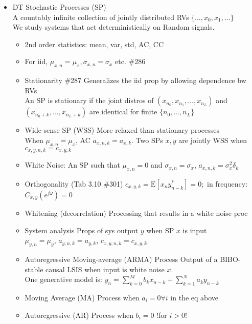 \documentclass{article}
\newcommand{\cg}{\color{gray}}
\newcommand{\fs}{\footnotesize}
\begin{document}
\begin{itemize}
	\item DT Stochastic Processes (SP)\\
	{\cg A countably infinite collection of jointly distributed RVs $\{\hdots, x_0, x_1, \hdots \}$\\
	We study systems that act deterministically on Random signals.}
	\begin{itemize}
		\item 2nd order statistics: {\cg mean, var, std, AC, CC}
		\item For iid, $\mu_{x,n}=\mu_x,\sigma_{x,n}=\sigma_x$ etc. \#286
		\item Stationarity \#287 {\cg Generalizes the iid prop by allowing dependence bw RVs}\\
		{\cg\fs An SP is stationary if the joint distros of $(x_{n_0},x_{n_1},\hdots,x_{n_L})$ and $(x_{n_0+k},\hdots,x_{n_L+k})$ are identical for finite $\{n_0,\hdots,n_L\}$}
		\item Wide-sense SP (WSS) {\cg More relaxed than stationary processes}\\
		{\cg\fs When $\mu_{x,n}=\mu_x$, AC $a_{x,n,k}=a_{x,k}$. Two SPs $x,y$ are jointly WSS when $c_{x,y,n,k}=c_{x,y,k}$}
		\item White Noise: {\cg An SP such that $\mu_{x,n}=0$ and $\sigma_{x,n}=\sigma_x$, $a_{x,n,k}=\sigma_x^2\delta_k$}
		\item Orthogonality (Tab 3.10 \#301) {\cg $c_{x,y,k}=\text{E}[x_n y^{*}_{n-k}]=0;$ in frequency: $C_{x,y}(e^{j\omega})=0$}		
		\item Whitening (decorrelation) {\cg Processing that results in a white noise proc}
		\item System analysis {\cg Props of sys output $y$ when SP $x$ is input}\\
		{\cg\fs$\mu_{y,n}=\mu_y$, $a_{y,n,k}=a_{y,k}$, $c_{x,y,n,k}=c_{x,y,k}$}
		\item Autoregressive Moving-average (ARMA) Process {\cg Output of a BIBO-stable causal LSIS when input is white noise $x$.} \\
		{\cg\fs One generative model is: $y_n=\sum\limits_{k=0}^M b_k x_{n-k}+\sum\limits_{k=1}^N a_k y_{n-k}$}
		\item Moving Average (MA) Process {\cg when $a_i=0 \forall i$ in the eq above}
		\item Autoregressive (AR) Process {\cg when $b_i=0$ !for $i>0$!}
	\end{itemize}
	
\end{itemize}
\end{document}

